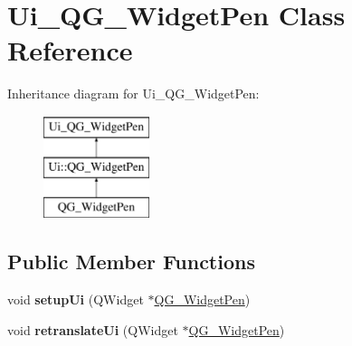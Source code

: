\hypertarget{classUi__QG__WidgetPen}{\section{Ui\-\_\-\-Q\-G\-\_\-\-Widget\-Pen Class Reference}
\label{classUi__QG__WidgetPen}
}
Inheritance diagram for Ui\-\_\-\-Q\-G\-\_\-\-Widget\-Pen\-:\begin{figure}[H]
\begin{center}
\leavevmode
\includegraphics[height=3.000000cm]{classUi__QG__WidgetPen}
\end{center}
\end{figure}
\subsection*{Public Member Functions}
\begin{DoxyCompactItemize}
\item 
\hypertarget{classUi__QG__WidgetPen_abddf9757aeb52e86f35cebc22b47b260}{void {\bfseries setup\-Ui} (Q\-Widget $\ast$\hyperlink{classQG__WidgetPen}{Q\-G\-\_\-\-Widget\-Pen})}\label{classUi__QG__WidgetPen_abddf9757aeb52e86f35cebc22b47b260}

\item 
\hypertarget{classUi__QG__WidgetPen_a77af33cb7d206a6b0fbdd71caffd18ae}{void {\bfseries retranslate\-Ui} (Q\-Widget $\ast$\hyperlink{classQG__WidgetPen}{Q\-G\-\_\-\-Widget\-Pen})}\label{classUi__QG__WidgetPen_a77af33cb7d206a6b0fbdd71caffd18ae}

\end{DoxyCompactItemize}
